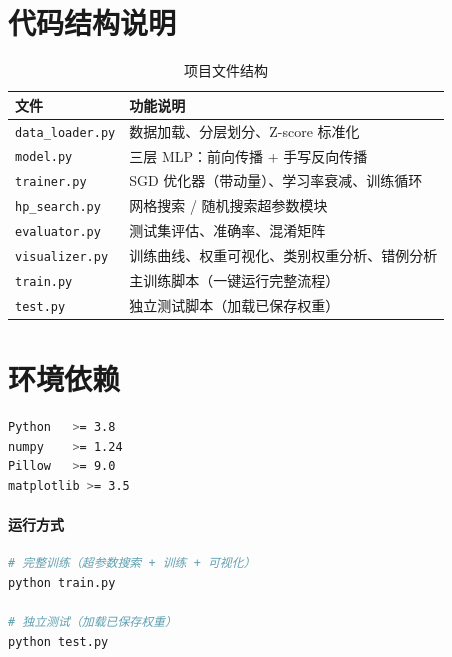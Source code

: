 \documentclass[12pt, a4paper]{article}
\begin{document}
\appendix
\section{代码结构说明}

\begin{table}[H]
  \centering
  \caption{项目文件结构}
  \label{tab:code}
  \begin{tabularx}{\textwidth}{lX}
    \toprule
    \textbf{文件} & \textbf{功能说明} \\
    \midrule
    \texttt{data\_loader.py} & 数据加载、分层划分、Z-score 标准化 \\
    \texttt{model.py}        & 三层 MLP：前向传播 + 手写反向传播 \\
    \texttt{trainer.py}      & SGD 优化器（带动量）、学习率衰减、训练循环 \\
    \texttt{hp\_search.py}   & 网格搜索 / 随机搜索超参数模块 \\
    \texttt{evaluator.py}    & 测试集评估、准确率、混淆矩阵 \\
    \texttt{visualizer.py}   & 训练曲线、权重可视化、类别权重分析、错例分析 \\
    \texttt{train.py}        & 主训练脚本（一键运行完整流程） \\
    \texttt{test.py}         & 独立测试脚本（加载已保存权重） \\
    \bottomrule
  \end{tabularx}
\end{table}

\section{环境依赖}

\begin{lstlisting}[language=bash, numbers=none]
Python   >= 3.8
numpy    >= 1.24
Pillow   >= 9.0
matplotlib >= 3.5
\end{lstlisting}

\paragraph{运行方式}

\begin{lstlisting}[language=bash, numbers=none]
# 完整训练（超参数搜索 + 训练 + 可视化）
python train.py

# 独立测试（加载已保存权重）
python test.py
\end{lstlisting}
\end{document}
